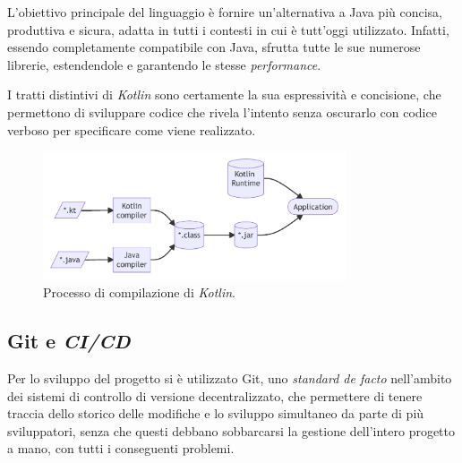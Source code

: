 L'obiettivo principale del linguaggio è fornire un'alternativa a Java più concisa, produttiva e sicura, adatta in tutti i contesti in cui è tutt'oggi utilizzato.
%
Infatti, essendo completamente compatibile con Java, sfrutta tutte le sue numerose librerie, estendendole e garantendo le stesse \textit{performance}.

I tratti distintivi di \textit{Kotlin} sono certamente la sua espressività e concisione, che permettono di sviluppare codice che rivela l'intento senza oscurarlo con codice verboso per specificare come viene realizzato.

\begin{figure}[h]
    \centering
    \includegraphics[width=0.8\textwidth]{resources/img/03-kotlincompilation.pdf}
    \caption{Processo di compilazione di \textit{Kotlin}.}
    \label{img:03-kotlin-compilation}
\end{figure}

\subsection*{Git e \textit{CI/CD}}
\label{03-git-ci}
Per lo sviluppo del progetto si è utilizzato Git, uno \textit{standard de facto} nell'ambito dei sistemi di controllo di versione decentralizzato, che permettere di tenere traccia dello storico delle modifiche e lo sviluppo simultaneo da parte di più sviluppatori, senza che questi debbano sobbarcarsi la gestione dell'intero progetto a mano, con tutti i conseguenti problemi.


